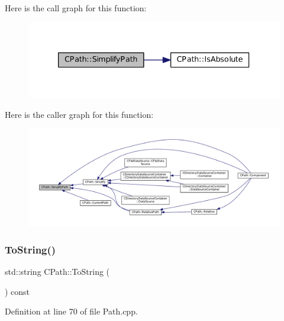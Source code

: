 Here is the call graph for this function\+:\nopagebreak
\begin{figure}[H]
\begin{center}
\leavevmode
\includegraphics[width=333pt]{classCPath_af0213a2ea0de0498ded236137e759922_cgraph}
\end{center}
\end{figure}
Here is the caller graph for this function\+:\nopagebreak
\begin{figure}[H]
\begin{center}
\leavevmode
\includegraphics[width=350pt]{classCPath_af0213a2ea0de0498ded236137e759922_icgraph}
\end{center}
\end{figure}
\hypertarget{classCPath_abbafaf377a7e38e0151bd9567d526951}{}\label{classCPath_abbafaf377a7e38e0151bd9567d526951} 
\subsubsection{\texorpdfstring{To\+String()}{ToString()}}
{\footnotesize\ttfamily std\+::string C\+Path\+::\+To\+String (\begin{DoxyParamCaption}{ }\end{DoxyParamCaption}) const}



Definition at line 70 of file Path.\+cpp.



